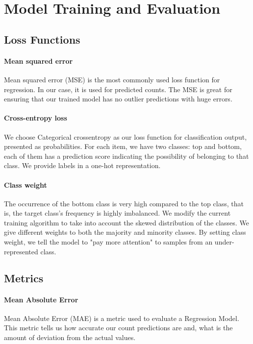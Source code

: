 \section{Model Training and Evaluation}
\subsection{Loss Functions}

\paragraph{Mean squared error} 
Mean squared error (MSE) is the most commonly used loss function for regression. In our case, it is used for predicted counts. The MSE is great for ensuring that our trained model has no outlier predictions with huge errors.

\paragraph{Cross-entropy loss} 
We choose Categorical crossentropy as our loss function for classification output, presented as probabilities. For each item, we have two classes: top and bottom, each of them has a prediction score indicating the possibility of belonging to that class. We provide labels in a one-hot representation. 

\paragraph{Class weight}
The occurrence of the bottom class is very high compared to the top class, that is, the target class’s frequency is highly imbalanced. We modify the current training algorithm to take into account the skewed distribution of the classes. We give different weights to both the majority and minority classes. By setting class weight, we tell the model to "pay more attention" to samples from an under-represented class.

\subsection{Metrics}

\paragraph{Mean Absolute Error} 
Mean Absolute Error (MAE) is a metric used to evaluate a Regression Model. This metric tells us how accurate our count predictions are and, what is the amount of deviation from the actual values.

